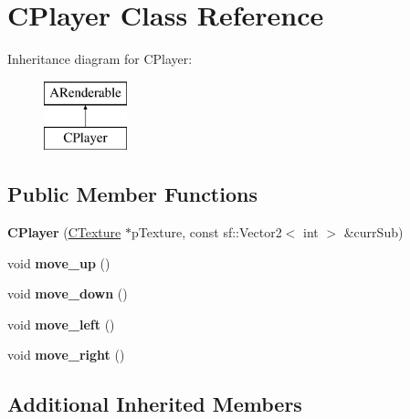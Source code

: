 \hypertarget{classCPlayer}{\section{C\-Player Class Reference}
\label{classCPlayer}
}
Inheritance diagram for C\-Player\-:\begin{figure}[H]
\begin{center}
\leavevmode
\includegraphics[height=2.000000cm]{classCPlayer}
\end{center}
\end{figure}
\subsection*{Public Member Functions}
\begin{DoxyCompactItemize}
\item 
\hypertarget{classCPlayer_a983c63a3e18585a94f66f0bd23c57cd3}{{\bfseries C\-Player} (\hyperlink{classCTexture}{C\-Texture} $\ast$p\-Texture, const sf\-::\-Vector2$<$ int $>$ \&curr\-Sub)}\label{classCPlayer_a983c63a3e18585a94f66f0bd23c57cd3}

\item 
\hypertarget{classCPlayer_a66e70893b9da823210b40638a19d6406}{void {\bfseries move\-\_\-up} ()}\label{classCPlayer_a66e70893b9da823210b40638a19d6406}

\item 
\hypertarget{classCPlayer_aaa672441a4b0b4544590492ddaf67e86}{void {\bfseries move\-\_\-down} ()}\label{classCPlayer_aaa672441a4b0b4544590492ddaf67e86}

\item 
\hypertarget{classCPlayer_acb93d455528a966b13f74371db2d60bc}{void {\bfseries move\-\_\-left} ()}\label{classCPlayer_acb93d455528a966b13f74371db2d60bc}

\item 
\hypertarget{classCPlayer_abdada73af7a83664c078260bc091a4ea}{void {\bfseries move\-\_\-right} ()}\label{classCPlayer_abdada73af7a83664c078260bc091a4ea}

\end{DoxyCompactItemize}
\subsection*{Additional Inherited Members}


